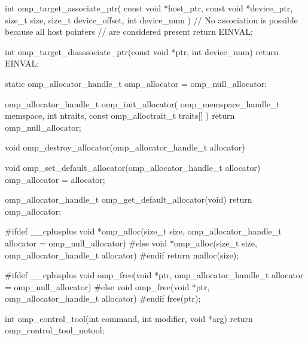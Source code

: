 {\begin{ompcFunction}
int omp_target_associate_ptr(
  const void *host_ptr,
  const void *device_ptr,
  size_t size,
  size_t device_offset,
  int device_num
)
{
  // No association is possible because all host pointers
  // are considered present
  return EINVAL;
}

int omp_target_disassociate_ptr(const void *ptr, int device_num)
{
  return EINVAL;
}

static omp_allocator_handle_t omp_allocator = omp_null_allocator;

omp_allocator_handle_t omp_init_allocator(
  omp_memspace_handle_t memspace,
  int ntraits,
  const omp_alloctrait_t traits[]
)
{
  return omp_null_allocator;
}

void omp_destroy_allocator(omp_allocator_handle_t allocator)
{
}

void omp_set_default_allocator(omp_allocator_handle_t allocator)
{
  omp_allocator = allocator;
}

omp_allocator_handle_t omp_get_default_allocator(void)
{
  return omp_allocator;
}

#ifdef __cplusplus
void *omp_alloc(size_t size, omp_allocator_handle_t allocator = omp_null_allocator)
#else
void *omp_alloc(size_t size, omp_allocator_handle_t allocator)
#endif
{
  return malloc(size);
}

#ifdef __cplusplus
void omp_free(void *ptr, omp_allocator_handle_t allocator = omp_null_allocator)
#else
void omp_free(void *ptr, omp_allocator_handle_t allocator)
#endif
{
  free(ptr);
}

int omp_control_tool(int command, int modifier, void *arg)
{
  return omp_control_tool_notool;
}

\end{ompcFunction}} %

